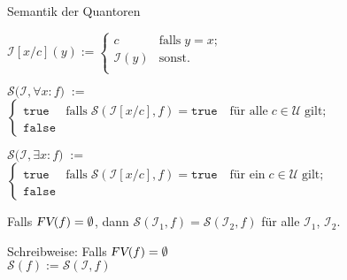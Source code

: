 \documentclass{slides}
\newcommand{\struct}{\mathcal{S}}
\newcommand{\FV}{\textsl{FV}}
\begin{document}

\begin{slide}{}
\normalsize
\begin{center}
Semantik der Quantoren
\end{center}
\vspace{0.5cm}

\footnotesize
\hspace*{1.3cm} 
    $\mathcal{I}[x/c](y) := \left\{
    \begin{array}{ll}
    c               & \mbox{falls}\; y = x;  \\
    \mathcal{I}(y)  & \mbox{sonst}.          \\
    \end{array}
    \right.$

 $\struct\bigl(\mathcal{I}, \forall x \!:\! f\bigr) \;:=\; $ \\[0.3cm]
 \hspace*{1.3cm} $\left\{
       \begin{array}{ll}
       \mathtt{true}  & \mbox{falls}\; \struct(\mathcal{I}[x/c], f) = \mathtt{true}\quad \mbox{f\"{u}r alle}\; c\in \mathcal{U}\;\mbox{gilt}; \\
       \mathtt{false} %
       \end{array}
       \right.$
\vspace{0.5cm}

 $\struct\bigl(\mathcal{I}, \exists x\!:\! f\bigr) \;:=\; $ \\[0.3cm]
 \hspace*{1.3cm} $\left\{
       \begin{array}{ll}
       \mathtt{true}  & \mbox{falls}\; \struct(\mathcal{I}[x/c], f) = \mathtt{true}\quad \mbox{f\"{u}r ein}\; c\in \mathcal{U}\;\mbox{gilt}; \\
       \mathtt{false} %
       \end{array}
       \right.$ 
\vspace{0.5cm}

Falls $\FV(f) = \emptyset$, dann $\mathcal{S}(\mathcal{I}_1, f) = \mathcal{S}(\mathcal{I}_2, f)$ 
f\"{u}r alle $\mathcal{I}_1$, $\mathcal{I}_2$.

Schreibweise: Falls $\FV(f) = \emptyset$ \\[0.1cm]
\hspace*{1.3cm} $\mathcal{S}(f) := \mathcal{S}(\mathcal{I}, f)$
\vspace{0.5cm}


\end{slide}
\end{document}
